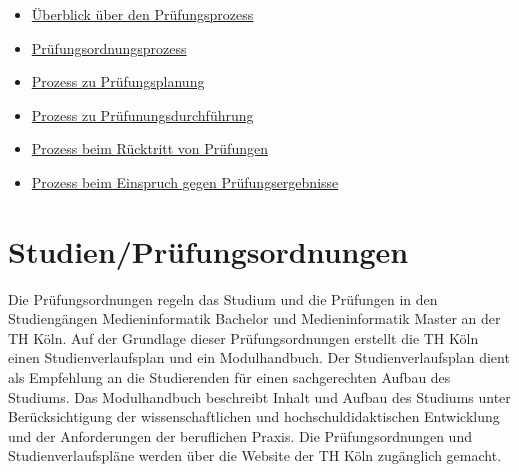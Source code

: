 \begin{itemize}
\tightlist
\item
  \href{https://th-koeln.github.io/mi-2017/anhaenge/Prozessbeschreibung_PruefungsprozessUeberblick.pdf}{Überblick
  über den Prüfungsprozess}
\item
  \href{https://th-koeln.github.io/mi-2017/anhaenge/Prozessbeschreibung_Pruefungsordnungsprozess.pdf}{Prüfungsordnungsprozess}
\item
  \href{https://th-koeln.github.io/mi-2017/anhaenge/Prozessbeschreibung_Pruefungplanung.pdf}{Prozess zu
  Prüfungsplanung}
\item
  \href{https://th-koeln.github.io/mi-2017/anhaenge/Prozessbeschreibung_Pruefungdurchfuehren.pdf}{Prozess
  zu Prüfunungsdurchführung}
\item
  \href{https://th-koeln.github.io/mi-2017/anhaenge/Prozessbeschreibung_vonPruefungzuruecktreten.pdf}{Prozess
  beim Rücktritt von Prüfungen}
\item
  \href{https://th-koeln.github.io/mi-2017/anhaenge/Prozessbeschreibung_EinspruchPruefungsergebnisse.pdf}{Prozess
  beim Einspruch gegen Prüfungsergebnisse}
\end{itemize}

\section{Studien/Prüfungsordnungen}\label{studienpruxfcfungsordnungen-1}

Die Prüfungsordnungen regeln das Studium und die Prüfungen in den
Studiengängen Medieninformatik Bachelor und Medieninformatik Master an
der TH Köln. Auf der Grundlage dieser Prüfungsordnungen erstellt die TH
Köln einen Studienverlaufsplan und ein Modulhandbuch. Der
Studienverlaufsplan dient als Empfehlung an die Studierenden für einen
sachgerechten Aufbau des Studiums. Das Modulhandbuch beschreibt Inhalt
und Aufbau des Studiums unter Berücksichtigung der wissenschaftlichen
und hochschuldidaktischen Entwicklung und der Anforderungen der
beruflichen Praxis. Die Prüfungsordnungen und Studienverlaufspläne
werden über die Website der TH Köln zugänglich gemacht.


